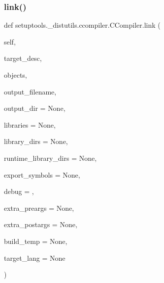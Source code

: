 \subsubsection{\texorpdfstring{link()}{link()}}
{\footnotesize\ttfamily def setuptools.\+\_\+distutils.\+ccompiler.\+C\+Compiler.\+link (\begin{DoxyParamCaption}\item[{}]{self,  }\item[{}]{target\+\_\+desc,  }\item[{}]{objects,  }\item[{}]{output\+\_\+filename,  }\item[{}]{output\+\_\+dir = {\ttfamily None},  }\item[{}]{libraries = {\ttfamily None},  }\item[{}]{library\+\_\+dirs = {\ttfamily None},  }\item[{}]{runtime\+\_\+library\+\_\+dirs = {\ttfamily None},  }\item[{}]{export\+\_\+symbols = {\ttfamily None},  }\item[{}]{debug = {},  }\item[{}]{extra\+\_\+preargs = {\ttfamily None},  }\item[{}]{extra\+\_\+postargs = {\ttfamily None},  }\item[{}]{build\+\_\+temp = {\ttfamily None},  }\item[{}]{target\+\_\+lang = {\ttfamily None} }\end{DoxyParamCaption})}

